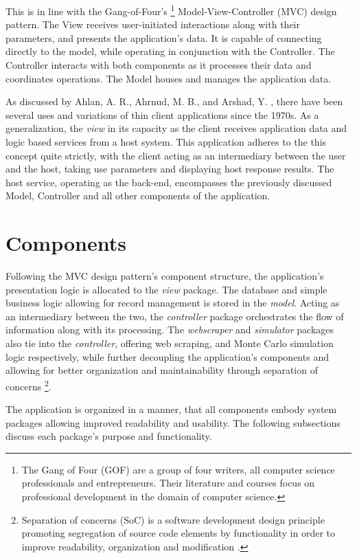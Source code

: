 \documentclass{thesis-ekf}
\theoremstyle{definition}
\theoremstyle{remark}
\begin{document}
This is in line with the Gang-of-Four's \footnote{The Gang of Four \cite{GOF2} (GOF) are a group of four writers, all computer science professionals and entrepreneurs. Their literature and courses focus on professional development in the domain of computer science.} Model-View-Controller (MVC) \cite[p.~529]{GOF} design pattern. The View receives user-initiated interactions along with their parameters, and presents the application's data. It is capable of connecting directly to the model, while operating in conjunction with the Controller. The Controller interacts with both components as it processes their data and coordinates operations. The Model houses and manages the application data.

As discussed by Ahlan, A. R., Ahrnud, M. B., and Arshad, Y. \cite{Kulliyyah}, there have been several uses and variations of thin client applications since the 1970s. As a generalization, the \emph{view} in its capacity as the client receives application data and logic based services from a host system. This application adheres to the this concept quite strictly, with the client acting as an intermediary between the user and the host, taking use parameters and displaying host response results. The host service, operating as the back-end, encompasses the previously discussed Model, Controller and all other components of the application.

\section{Components}
Following the MVC design pattern's component structure, the application's presentation logic is allocated to the \emph{view} package. The database and simple business logic allowing for record management is stored in the \emph{model}. Acting as an intermediary between the two, the \emph{controller} package orchestrates the flow of information along with its processing. The \emph{webscraper} and \emph{simulator} packages also tie into the \emph{controller}, offering web scraping, and Monte Carlo simulation logic respectively, while further decoupling the application's components and allowing for better organization and maintainability through separation of concerns \footnote{Separation of concerns (SoC) is a software development design principle promoting segregation of source code elements by functionality in order to improve readability, organization and modification \cite{Reade}.}.

The application is organized in a manner, that all components embody system packages allowing improved readability and usability. The following subsections discuss each package's purpose and functionality.
\end{document}
